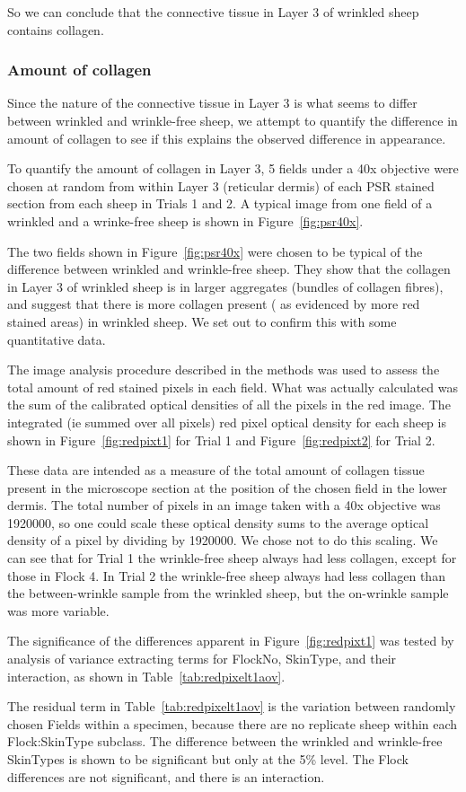 \documentclass[titlepage]{article}  %
\begin{document}
So we can conclude that the  connective tissue in Layer 3 of wrinkled sheep contains collagen. 

\subsubsection{Amount of collagen}
Since the nature of the connective tissue in Layer 3 is what seems to differ between wrinkled and wrinkle-free sheep, we attempt to quantify the difference in amount of collagen to see if this explains the observed difference in appearance.

To quantify the amount of collagen in Layer 3, 5 fields under a 40x objective were chosen at random from within Layer 3 (reticular dermis) of each PSR stained section from each sheep in Trials 1 and 2. A typical image from one field of a wrinkled and a wrinke-free sheep is shown in Figure~\ref{fig:psr40x}.

The two fields shown in Figure~\ref{fig:psr40x} were chosen to be typical of the difference between wrinkled and wrinkle-free sheep. They show that the collagen in Layer 3 of wrinkled sheep is in larger aggregates (bundles of collagen fibres), and suggest that there is more collagen present ( as evidenced by more red stained areas) in wrinkled sheep. We set out to confirm this with some quantitative data.

 The image analysis procedure described in the methods was used to assess the total amount of red stained pixels in each field.  What was actually calculated was the sum of the calibrated optical densities of all the pixels in the red image. The integrated (ie summed over all pixels) red pixel optical density for each sheep is shown  in Figure~\ref{fig:redpixt1} for Trial 1 and Figure~\ref{fig:redpixt2} for Trial 2.


These data are intended as a measure of the total amount of collagen tissue present in the microscope section at the position of the chosen field in the lower dermis.
The total number of pixels in an image taken with a 40x objective was 1920000, so one could scale these optical density sums to the average optical density of a pixel by dividing by 1920000. We chose not to do this scaling.
We can see that for Trial 1 the wrinkle-free sheep always had less collagen, except for those in Flock 4. In Trial 2  the wrinkle-free sheep always had less collagen than the between-wrinkle sample from the wrinkled sheep, but the on-wrinkle sample was more variable.

The significance of the differences apparent in Figure~\ref{fig:redpixt1} was tested by analysis of variance extracting terms for FlockNo, SkinType, and their interaction, as shown in Table~\ref{tab:redpixelt1aov}.

The residual term in Table~\ref{tab:redpixelt1aov} is the variation between randomly chosen Fields within a specimen, because there are no replicate sheep within each Flock:SkinType subclass. The difference between the wrinkled and wrinkle-free SkinTypes is shown to be significant but only at the 5\% level. The Flock differences are not significant, and there is an interaction.
\end{document}

